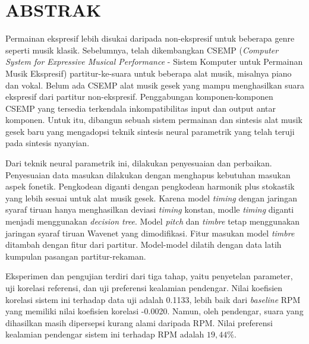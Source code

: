 \clearpage
\chapter*{ABSTRAK}

Permainan ekspresif lebih disukai daripada non-ekspresif untuk beberapa genre seperti musik klasik. Sebelumnya, telah dikembangkan CSEMP (\textit{Computer System for Expressive Musical Performance} - Sistem Komputer untuk Permainan Musik Ekspresif) partitur-ke-suara untuk beberapa alat musik, misalnya piano dan vokal. Belum ada CSEMP alat musik gesek yang mampu menghasilkan suara ekspresif dari partitur non-ekspresif. Penggabungan komponen-komponen CSEMP yang tersedia terkendala inkompatibilitas input dan output antar komponen. Untuk itu, dibangun sebuah sistem permainan dan sintesis alat musik gesek baru yang mengadopsi teknik sintesis neural parametrik yang telah teruji pada sintesis nyanyian.

Dari teknik neural parametrik ini, dilakukan penyesuaian dan perbaikan. Penyesuaian data masukan dilakukan dengan menghapus kebutuhan masukan aspek fonetik. Pengkodean diganti dengan pengkodean harmonik plus stokastik yang lebih sesuai untuk alat musik gesek. Karena model \textit{timing} dengan jaringan syaraf tiruan hanya menghasilkan deviasi \textit{timing} konstan, modle \textit{timing} diganti menjadi menggunakan \textit{decision tree}. Model \textit{pitch} dan \textit{timbre} tetap menggunakan jaringan syaraf tiruan Wavenet yang dimodifikasi. Fitur masukan model \textit{timbre} ditambah dengan fitur dari partitur. Model-model dilatih dengan data latih kumpulan pasangan partitur-rekaman.

Eksperimen dan pengujian terdiri dari tiga tahap, yaitu penyetelan parameter, uji korelasi referensi, dan uji preferensi kealamian pendengar. Nilai koefisien korelasi sistem ini terhadap data uji adalah 0.1133, lebih baik dari \textit{baseline} RPM yang memiliki nilai koefisien korelasi -0.0020. Namun, oleh pendengar, suara yang dihasilkan masih dipersepsi kurang alami daripada RPM. Nilai preferensi kealamian pendengar sistem ini terhadap RPM adalah $19,44\%$.

\clearpage